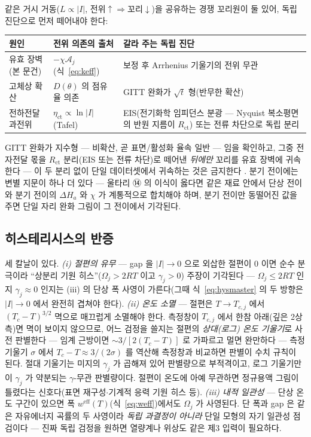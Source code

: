 \documentclass[11pt,a4paper]{article}
\newcommand{\eff}{\mathrm{eff}}
\begin{document}
같은 거시 거동($L\propto|I|$, 전위$\uparrow\Rightarrow$꼬리$\downarrow$)을 공유하는 경쟁 꼬리원이
둘 있어, 독립 진단으로 먼저 떼어내야 한다:
\begin{center}
\renewcommand{\arraystretch}{1.35}
\begin{tabular}{p{} p{} p{}}
\toprule
원인 & 전위 의존의 출처 & 갈라 주는 독립 진단 \\
\midrule
유효 장벽(본 문건) & $-\chi\mathcal A_j$(식~\eqref{eq:keff}) & 보정 후 Arrhenius 기울기의 전위 무관 \\
고체상 확산 & $D(\theta)$ 의 점유율 의존 & GITT 완화가 $\sqrt t$ 형(반무한 확산) \\
전하전달 과전위 & $\eta_{\mathrm{ct}}\propto\ln|I|$(Tafel) & EIS(전기화학 임피던스 분광 — Nyquist
복소평면의 반원 지름이 $R_{\mathrm{ct}}$) 또는 전류 차단으로 독립 분리 \\
\bottomrule
\end{tabular}
\end{center}
GITT 완화가 지수형 — 비확산, 곧 표면/활성화 율속 일반 — 임을 확인하고, 그중 전자전달 몫을
$R_{\mathrm{ct}}$ 분리(EIS 또는 전류 차단)로 떼어낸 \emph{뒤에만} 꼬리를 유효 장벽에 귀속한다 — 이
두 분리 없이 단일 데이터셋에서 귀속하는 것은 금지한다 \cite{weppner1977,bardfaulkner}. 분기 전이에는
변별 지문이 하나 더 있다 — 울타리 ⑭ 의 이식이 옳다면 같은 재료 안에서 단상 전이와 분기 전이의
$\Delta H_{a}$ 와 $\chi$ 가 계통적으로 합치해야 하며, 분기 전이만 동떨어진 값을 주면 단일 자리 완화
그림이 그 전이에서 기각된다.

\subsection{히스테리시스의 반증}
세 칼날이 있다. \emph{(i) 절편의 유무} — gap 을 $|I|\to0$ 으로 외삽한 절편이 $0$ 이면 순수 분극이라 ``상분리 기원
히스''($\Omega_j>2RT$ 이고 $\gamma_j>0$) 주장이 기각된다 — $\Omega_j\le2RT$ 인지
$\gamma_j\approx0$ 인지는 (iii) 의 단상 폭 사영이 가른다(그때 식~\eqref{eq:hysmaster} 의 두 방향은
$|I|\to0$ 에서 완전히 겹쳐야 한다).
\emph{(ii) 온도 소멸} — 절편은 $T\to T_{c,j}$ 에서 $(T_c-T)^{3/2}$ 멱으로 매끄럽게 소멸해야 한다.
측정창이 $T_{c,j}$ 에서 한참 아래(깊은 2상측)면 멱이 보이지 않으므로, 어느 검정을 쓸지는 절편의
\emph{상대(로그) 온도 기울기}로 사전 판별한다 — 임계 근방이면 $\sim3/[2(T_c-T)]$ 로 가파르고 멀면
완만하다 — 측정 기울기 $\sigma$ 에서 $T_c-T\approx3/(2\sigma)$ 를 역산해 측정창과 비교하면 판별이
수치 규칙이 된다. 절대 기울기는 미지의 $\gamma_j$ 가 곱해져 있어 판별량으로 부적격이고, 로그 기울기만이
$\gamma_j$ 가 약분되는 $\gamma$-무관 판별량이다. 절편이 온도에 아예 무관하면 정규용액 그림이 틀렸다는
신호다(표면 재구성$\cdot$기계적 응력 기원 히스 등). \emph{(iii) 내적 일관성} — 단상 온도 구간이 있으면
폭 $w^{\eff}(T)$(식~\eqref{eq:weff})에서도 $\Omega_j$ 가 사영된다. 단 폭과 gap 은 같은 자유에너지
곡률의 두 사영이라 \emph{독립 과결정이 아니라} 단일 모형의 자기 일관성 점검이다 — 진짜 독립 검정을
원하면 열량계나 위상도 같은 제3 입력이 필요하다.
\end{document}
